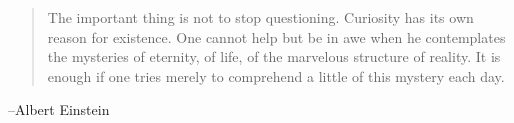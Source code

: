 \documentclass[letterpaper, landscape]{exam}
\begin{document}
  \else
    \vspace{10 cm}
    \begin{quote}
      \begin{em}
        The important thing is not to stop questioning. Curiosity has its own reason
        for existence. One cannot help but be in awe when he contemplates the mysteries
        of eternity, of life, of the marvelous structure of reality. It is enough if
        one tries merely to comprehend a little of this mystery each day.
      \end{em}
    \end{quote}
    \hspace{2 cm} --Albert Einstein
  \fi
\end{document}
